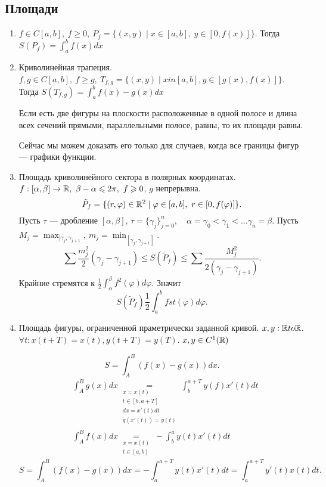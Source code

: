     \subsection{Площади}
    \begin{enumerate}
	\item $ f \in C[a, b], ~ f \ge 0, ~ P_f = \{(x, y) \mid x \in  [a, b], ~ y \in  [0, f(x)]\}$. Тогда $S(P_{f}) = \int_{a}^{b} f(x) dx $
	\item Криволинейная трапеция. $ f, g \in  C[a, b], ~ f \ge g, ~ T _{f, g} = \{ (x, y) \mid x in [a, b] , y \in  [g(x), f(x)] \}$.
	    Тогда $ S(T_{f, g}) = \int_{a}^{b} f(x) -g(x) dx $
	    \begin{cor}
		Если есть две фигуры на плоскости расположенные в одной полосе и длина всех сечений прямыми, параллельными полосе, равны, то их площади равны.

		Сейчас мы можем доказать его только для случаев, когда все границы фигур --- графики функции.
	    \end{cor}
	\item Площадь криволинейного сектора в полярных координатах.
	    $ f : [ \alpha  , \beta ] \to  \mathbb{R}, ~ \beta  - \alpha \leqslant  2 \pi, ~ f \geqslant 0$, $ g$ непрерывна.
	    \[
		\tilde P_f = \{ (r, \varphi ) \in  \mathbb{R}^2 \mid \varphi  \in  [a, b], ~ r \in  [0, f( \varphi )]\}
	    .\]
	    Пусть $ \tau$ --- дробление $ [ \alpha , \beta ]$, $ \tau  = \{ \gamma_j \}^{n}_{j = 0}, \quad \alpha = \gamma_0 < \gamma_1 < \ldots \gamma_n  = \beta $.
	    Пусть $ M _j= \max_{[\gamma_j, \gamma_{j+1}}, ~ m_j = \min_{[\gamma _j, \gamma_{j+1}]}$.
	    \[
		\sum \frac{m^2_j}{2}(\gamma _j - \gamma_{j+1}) \le  S(\tilde P_f) \le \sum \frac{M_j^2}{2 (\gamma _j - \gamma_{j+1})}
	    .\]
	    Крайние стремятся к $ \frac{1}{2} \int_{ \alpha }^{ \beta } f^2( \varphi )  d \varphi $.
	    Значит
	    \[
		S(\tilde P_f) \frac{1}{2} \int_{ a}^{b} fst( \varphi ) d \varphi
	    .\]
	\item Площадь фигуры, ограниченной праметрически заданной кривой.
	    $ x, y :  \mathbb{R} to \mathbb{R}$. $ \forall  t: x(t + T) = x(t) , y(t + T) = y(T)$. $ x, y \in  C^{1}(\mathbb{R})$
	    \begin{figure}[ht]
		\centering
		\label{fig:param}
	    \end{figure}
	    \[
		S = \int_{A}^{B}  (f(x) - g(x) ) dx
	    .\]
	    \begin{align*}
    &\int_{A}^{B}  g(x) dx \underset{\substack{x= x(t)\\ t \in [b, a+ T]\\ dx = x'(t) dt \\ g(x'(t)) = y(t)}}{=} \int_{b}^{a + T} y(f) x'(t) dt \\
    & \int_{A}^{B}  f(x) dx \underset{\substack{x=x(t)\\ t \in [a, b]}}{=} -\int_{b}^{a} y(t)  x'(t) dt
	    \end{align*}
	    \[
		S = \int_{A}^{B}  (f(x) - g(x) ) dx  = - \int_{a}^{ a+T} y(t) x'(t) dt  = \int_{a}^{ a+T}  y'(t) x(t) dt
	    .\]
    \end{enumerate}
